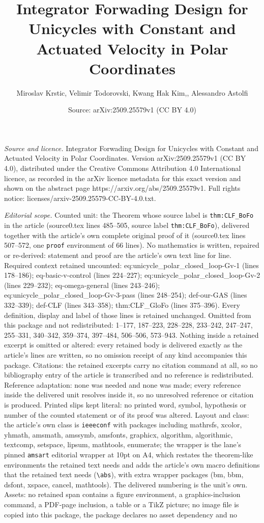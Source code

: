 \documentclass[10pt,a4paper]{amsart}
\title[Integrator Forwading Design for Unicycles with Constant and ]{Integrator Forwading Design for Unicycles with Constant and Actuated Velocity in Polar Coordinates}
\author{Miroslav Krstic, Velimir Todorovski, Kwang Hak Kim,, Alessandro Astolfi}
\date{Source: arXiv:2509.25579v1 (CC BY 4.0)}
\begin{document}
\maketitle

\noindent\emph{Source and licence.} Integrator Forwading Design for Unicycles with Constant and Actuated Velocity in Polar Coordinates. Version arXiv:2509.25579v1 (CC BY 4.0), distributed under the Creative Commons Attribution 4.0 International licence, as recorded in the arXiv licence metadata for this exact version and shown on the abstract page https://arxiv.org/abs/2509.25579v1. Full rights notice: licenses/arxiv-2509.25579-CC-BY-4.0.txt.\par\smallskip

\noindent\textit{Editorial scope.} Counted unit: the Theorem whose source label is \texttt{thm:CLF\_BoFo} in the article (source0.tex lines 485--505, source label \texttt{thm:CLF\_BoFo}), delivered together with the article's own complete original proof of it (source0.tex lines 507--572, one \texttt{proof} environment of 66 lines). No mathematics is written, repaired or re-derived: statement and proof are the article's own text line for line. Required context retained uncounted: eq:unicycle\_polar\_closed\_loop-Gv-1 (lines 178--186); eq-basic-v-control (lines 224--227); eq:unicycle\_polar\_closed\_loop-Gv-2 (lines 229--232); eq-omega-general (lines 243--246); eq:unicycle\_polar\_closed\_loop-Gv-3-pass (lines 248--254); def-our-GAS (lines 332--339); def-CLF (lines 343--358); thm:CLF\_GloFo (lines 375--396). Every definition, display and label of those lines is retained unchanged. Omitted from this package and not redistributed: 1--177, 187--223, 228--228, 233--242, 247--247, 255--331, 340--342, 359--374, 397--484, 506--506, 573--943. Nothing inside a retained excerpt is omitted or altered: every retained body is delivered exactly as the article's lines are written, so no omission receipt of any kind accompanies this package. Citations: the retained excerpts carry no citation command at all, so no bibliography entry of the article is transcribed and no reference is redistributed. Reference adaptation: none was needed and none was made; every reference inside the delivered unit resolves inside it, so no unresolved reference or citation is produced. Printed slips kept literal: no printed word, symbol, hypothesis or number of the counted statement or of its proof was altered. Layout and class: the article's own class is \texttt{ieeeconf} with packages including mathrsfs, xcolor, yhmath, amsmath, amssymb, amsfonts, graphicx, algorithm, algorithmic, textcomp, setspace, lipsum, mathtools, enumerate; the wrapper is the lane's pinned \texttt{amsart} editorial wrapper at 10pt on A4, which restates the theorem-like environments the retained text needs and adds the article's own macro definitions that the retained text needs (\texttt{\textbackslash abs}), with extra wrapper packages (bm, bbm, dsfont, xspace, cancel, mathtools). The delivered numbering is the unit's own. Assets: no retained span contains a figure environment, a graphics-inclusion command, a PDF-page inclusion, a table or a TikZ picture; no image file is copied into this package, the package declares no asset dependency and no 
\end{document}
